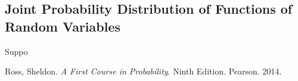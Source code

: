 \documentclass[12pt]{article}
\theoremstyle{plain}
\theoremstyle{definition}
\theoremstyle{remark}
\begin{document}
\subsection{Joint Probability Distribution of Functions of Random Variables}

Suppo


\begin{thebibliography}{13}

 Ross, Sheldon. \textit{A First Course in Probability}. Ninth Edition. Pearson. 2014.



 
\end{thebibliography}
\end{document}
